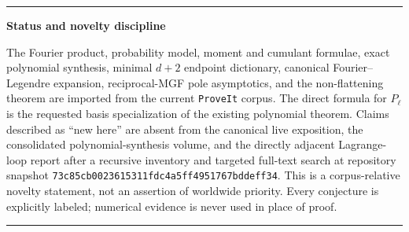 \documentclass[11pt,oneside]{article}
\numberwithin{equation}{section}
\theoremstyle{definition}
\theoremstyle{remark}
\newenvironment{statusbox}[1]{%
  \par\smallskip\noindent\begin{center}\begin{minipage}{0.94\textwidth}%
  \hrule\vspace{0.55em}\noindent\textbf{#1}\par\smallskip
}{%
  \vspace{0.55em}\hrule\end{minipage}\end{center}\smallskip
}
\begin{document}
\begin{abstract}
The principal new structure here is a dual translated-moment kernel
\[
 \Lambda_m(c)=\frac{2m+1}{2}\int_{-1}^{1}u(x-c)P_m(x)\Differential x.
\]
It is compactly supported and smooth, satisfies
$\Lambda_{2n}(0)=u_n$, and has the spherical-Bessel representation
\[
 \Lambda_m(c)=(2m+1)(-\ImaginaryUnit)^m\int_{\RealNumbers}
 \widehat u(\xi)j_m(2\pi\xi)\EulerE^{2\pi\ImaginaryUnit\xi c}\Differential\xi.
\]
The finite Legendre synthesis and this dual analysis obey exact dyadic
biorthogonality:
\[
 \frac1M\sum_{|k|<2M}Q_\ell(k/M)\Lambda_m(k/M)=\delta_{m\ell}.
\]
Expanding every shifted atom back into local Legendre polynomials gives a
second closure.  It produces explicit rational coefficients
$T_{m\ell r}^{(M)}$ for which
\[
 \delta_{m\ell}=\sum_{r\ge0}u_rT_{m\ell r}^{(M)}.
\]
These are infinite rational spectral identities with exact parity blocks.
Endpoint flatness supplies a separate hierarchy of exact cancellation laws,
\[
 \sum_{r\ge\lceil s/2\rceil}u_r
 \frac{(2r+s)!}{2^ss!(2r-s)!}=0
 \qquad(s\ge0).
\]
Finally, the sharp real-axis sinc-product envelope from the repository, when
combined with the Bessel representation, yields the rigorous coefficient
bound
\[
 |u_n|\le C\frac{n^\sigma}{\log n}
 \exp\!\left(-\frac{(\log n)^2}{2\log2}\right)
\]
for an explicit finite $\sigma$.  Exact arithmetic through $n=80$ suggests
the new conjecture $\TwoAdicValuation(u_n)=-1$ for every $n$, while moments through
$\mu_{160}$ suggest
$\TwoAdicValuation(\mu_{2m}-1)=3+\TwoAdicValuation(m)$.  All numerical and symbolic experiments are
reproducible from the accompanying commented Python program.
\end{abstract}

\begin{statusbox}{Status and novelty discipline}
The Fourier product, probability model, moment and cumulant formulae, exact
polynomial synthesis, minimal $d+2$ endpoint dictionary, canonical
Fourier--Legendre expansion, reciprocal-MGF pole asymptotics, and the
non-flattening theorem are imported from the current \texttt{ProveIt} corpus.
The direct formula for $P_\ell$ is the requested basis specialization of the
existing polynomial theorem.  Claims described as ``new here'' are absent from
the canonical live exposition, the consolidated polynomial-synthesis volume,
and the directly adjacent Lagrange-loop report after a recursive inventory and
targeted full-text search at repository snapshot
\texttt{73c85cb0023615311fdc4a5ff4951767bddeff34}.  This is a corpus-relative
novelty statement, not an assertion of worldwide priority.  Every conjecture
is explicitly labeled; numerical evidence is never used in place of proof.
\end{statusbox}
\end{document}

